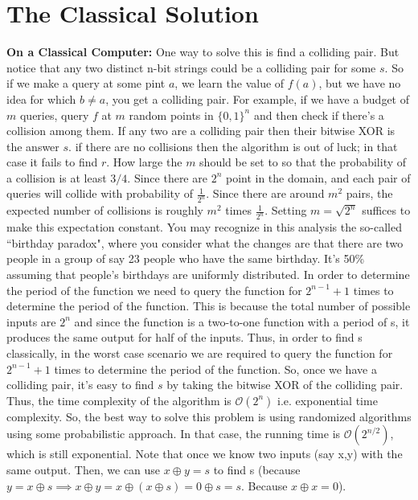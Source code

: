 \documentclass[12pt, oneside]{book}
\theoremstyle{definition}
\theoremstyle{definition}
\theoremstyle{remark}
\begin{document}
\section{The Classical Solution}
\textbf{On a Classical Computer: }One way to solve this is find a colliding pair. But notice that any two distinct n-bit strings could be a colliding pair for some $s$. So if we make a query at some pint $a$, we learn the value of $f(a)$, but we have no idea for which $b\neq a$, you get a colliding pair. For example, if we have a budget of $m$ queries, query $f$ at $m$ random points in $\{0,1\}^n$ and then check if there's a collision among them. If any two are a colliding pair then their bitwise XOR is the answer $s$. if there are no collisions then the algorithm is out of luck; in that case it fails to find $r$. How large the $m$ should be set to so that the probability of a collision is at least $3/4$. Since there are $2^n$ point in the domain, and each pair of queries will collide with probability of $\frac{1}{2^n}$. Since there are around $m^2$ pairs, the expected number of collisions is roughly $m^2$ times $\frac{1}{2^n}$. Setting $m=\sqrt{2^n}$ suffices to make this expectation constant. You may recognize in this analysis the so-called ``birthday paradox", where you consider what the changes are that there are two people in a group of say 23 people who have the same birthday. It's 50\% assuming that people's birthdays are uniformly distributed. In order to determine the period of the function we need to query the function for $2^{n-1}+1$ times to determine the period of the function. 
This is because the total number of possible inputs are $2^n$ and since the function is a two-to-one function with a period of s, it produces the same output for half of the inputs.
Thus, in order to find s classically, in the worst case scenario we are required to query the function for $2^{n-1}+1$ times to determine the period of the function. So, once we have a colliding pair, it's easy to find $s$ by taking the bitwise XOR of the colliding pair.
Thus, the time complexity of the algorithm is $\mathcal{O}(2^n)$ i.e. exponential time complexity. So, the best way to solve this problem is using randomized algorithms using some probabilistic approach. In that case, 
the running time is $\mathcal{O}(2^{n/2})$, which is still exponential. Note that once we know two inputs (say x,y) with the same output. Then, we can use $x \oplus y=s$ to find s (because $y=x\oplus s\implies x \oplus y=x\oplus (x \oplus s) = 0\oplus s=s$. Because $x \oplus x=0$).
\end{document}
